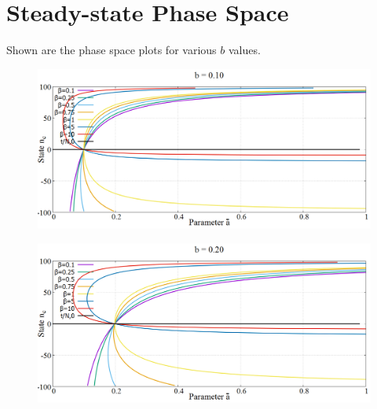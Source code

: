 \chapter{Steady-state Phase Space}
\label{apndx:phasespace}
\hspace{\parindent} Shown are the phase space plots for various $b$ values.
\begin{figure}[h!]
 \centering
  \includegraphics[width=\linewidth]{images/appendix/phaseSpace/1.png}
\end{figure}

\begin{figure}[h!]
 \centering
  \includegraphics[width=\linewidth]{images/appendix/phaseSpace/2.png}
\end{figure}

